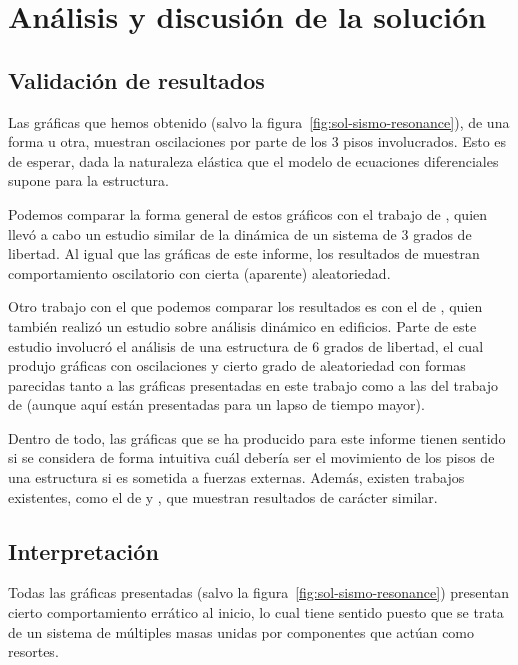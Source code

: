 \section{Análisis y discusión de la solución}

\subsection{Validación de resultados}

Las gráficas que hemos obtenido (salvo la figura~\ref{fig:sol-sismo-resonance}), de una forma u otra, muestran oscilaciones por parte de los 3 pisos involucrados. Esto es de esperar, dada la naturaleza elástica que el modelo de ecuaciones diferenciales supone para la estructura.

Podemos comparar la forma general de estos gráficos con el trabajo de \citet{hernandez}, quien llevó a cabo un estudio similar de la dinámica de un sistema de 3 grados de libertad. Al igual que las gráficas de este informe, los resultados de \citet{hernandez} muestran comportamiento oscilatorio con cierta (aparente) aleatoriedad.

Otro trabajo con el que podemos comparar los resultados es con el de \citet{garcia}, quien también realizó un estudio sobre análisis dinámico en edificios. Parte de este estudio involucró el análisis de una estructura de 6 grados de libertad, el cual produjo gráficas con oscilaciones y cierto grado de aleatoriedad con formas parecidas tanto a las gráficas presentadas en este trabajo como a las del trabajo de \citet{hernandez} (aunque aquí están presentadas para un lapso de tiempo mayor).

Dentro de todo, las gráficas que se ha producido para este informe tienen sentido si se considera de forma intuitiva cuál debería ser el movimiento de los pisos de una estructura si es sometida a fuerzas externas. Además, existen trabajos existentes, como el de \citet{hernandez} y \citet{garcia}, que muestran resultados de carácter similar.


\subsection{Interpretación}

Todas las gráficas presentadas (salvo la figura~\ref{fig:sol-sismo-resonance}) presentan cierto comportamiento errático al inicio, lo cual tiene sentido puesto que se trata de un sistema de múltiples masas unidas por componentes que actúan como resortes.

